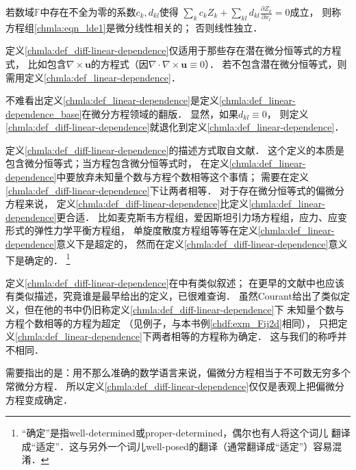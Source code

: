 \begin{definition}\label{chmla:def_diff-linear-dependence}
    若数域$\mathbb{F}$中存在不全为零的系数${c_k},d_{kl}$使得
    $\sum_k {{c_k}{Z_k}}  + \sum_{kl} {{d_{kl}}
        \frac{{\partial {Z_k}}}{{\partial {x_l}}}} = 0$成立，
    则称方程组\eqref{chmla:eqn_lde1}是{\heiti 微分}线性相关的；
    否则线性独立．
\end{definition}

\begin{remark}
	定义\ref{chmla:def_diff-linear-dependence}仅适用于那些存在潜在微分恒等式的方程式，
	比如包含$\nabla \times \boldsymbol{u}$的方程式（因$\nabla\cdot\nabla \times \boldsymbol{u}\equiv 0$）．
	若不包含潜在微分恒等式，则需用定义\ref{chmla:def_linear-dependence}．
\end{remark}

不难看出定义\ref{chmla:def_linear-dependence}是定义\ref{chmla:def_linear-dependence_base}在微分方程领域的翻版．
显然，如果$d_{kl}\equiv 0$，
则定义\ref{chmla:def_diff-linear-dependence}就退化到定义\ref{chmla:def_linear-dependence}．


定义\ref{chmla:def_diff-linear-dependence}的描述方式取自文献\parencite{liu2018}．
这个定义的本质是包含微分恒等式；当方程包含微分恒等式时，
在定义\ref{chmla:def_linear-dependence}中要放弃未知量个数与方程个数相等这个事情；
需要在定义\ref{chmla:def_diff-linear-dependence}下让两者相等．
对于存在微分恒等式的偏微分方程来说，
定义\ref{chmla:def_diff-linear-dependence}比定义\ref{chmla:def_linear-dependence}更合适．
比如麦克斯韦方程组，爱因斯坦引力场方程组，应力、应变形式的弹性力学平衡方程组，
单旋度散度方程组等等在定义\ref{chmla:def_linear-dependence}意义下是超定的，
然而在定义\ref{chmla:def_diff-linear-dependence}意义下是确定的．
{\footnote{“确定”是指well-determined或proper-determined，偶尔也有人将这个词儿
        翻译成“适定”．这与另外一个词儿well-posed的翻译（通常翻译成“适定”）容易混淆．}}

定义\ref{chmla:def_diff-linear-dependence}在\textcite[p.16]{courant_hilbert-v2}中有类似叙述；
在更早的文献中也应该有类似描述，究竟谁是最早给出的定义，已很难查询．
虽然Courant给出了类似定义，但在他的书中仍旧称定义\ref{chmla:def_diff-linear-dependence}下
未知量个数与方程个数相等的方程为{\kaishu 超定}
（见\parencite[p.16]{courant_hilbert-v2}例子，与本书例\ref{chdf:exm_Fij2d}相同），
只把定义\ref{chmla:def_linear-dependence}下两者相等的方程称为确定．
这与我们的称呼并不相同．

需要指出的是：用不那么准确的数学语言来说，偏微分方程相当于{\kaishu 不可数}无穷多个常微分方程．
所以定义\ref{chmla:def_diff-linear-dependence}仅仅是{\kaishu 表观上}把偏微分方程变成确定．


